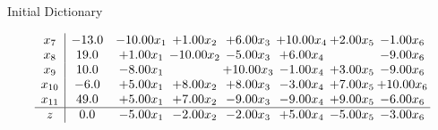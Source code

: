 \documentclass[8pt]{article}
\begin{document}
Initial Dictionary 

\[\begin{array}{c| c c@{\hskip 2pt} c@{\hskip 2pt} c@{\hskip 2pt} c@{\hskip 2pt} c@{\hskip 2pt} c@{\hskip 2pt} }
 x_{7}   &  -13.0 & -10.00 x_{1} & +  1.00 x_{2} & +  6.00 x_{3} & + 10.00 x_{4} & +  2.00 x_{5} & -1.00 x_{6}\\
 x_{8}   &  19.0 & +  1.00 x_{1} & -10.00 x_{2} & -5.00 x_{3} & +  6.00 x_{4} &   & -9.00 x_{6}\\
 x_{9}   &  10.0 & -8.00 x_{1} &   & + 10.00 x_{3} & -1.00 x_{4} & +  3.00 x_{5} & -9.00 x_{6}\\
 x_{10}   &  -6.0 & +  5.00 x_{1} & +  8.00 x_{2} & +  8.00 x_{3} & -3.00 x_{4} & +  7.00 x_{5} & + 10.00 x_{6}\\
 x_{11}   &  49.0 & +  5.00 x_{1} & +  7.00 x_{2} & -9.00 x_{3} & -9.00 x_{4} & +  9.00 x_{5} & -6.00 x_{6}\\
\hline
z    &  0.0 & -5.00 x_{1} & -2.00 x_{2} & -2.00 x_{3} & +  5.00 x_{4} & -5.00 x_{5} & -3.00 x_{6}\\
\end{array}\]
\end{document}
